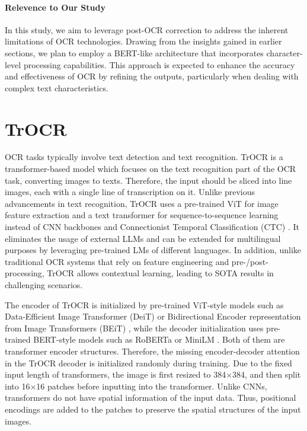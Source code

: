 \paragraph*{Relevence to Our Study}
\label{par:2_post_ocr_relevance}
\hypertarget{model_needs}{In this study, we aim to leverage post-OCR correction to address the inherent limitations of OCR technologies. Drawing from the insights gained in earlier sections, we plan to employ a BERT-like architecture that incorporates character-level processing capabilities. This approach is expected to enhance the accuracy and effectiveness of OCR by refining the outputs, particularly when dealing with complex text characteristics.}

\section{TrOCR}
\label{sec:2_trocr}
OCR tasks typically involve text detection and text recognition. TrOCR is a transformer-based model which focuses on the text recognition part of the OCR task, converting images to texts. Therefore, the input should be sliced into line images, each with a single line of transcription on it. Unlike previous advancements in text recognition, TrOCR uses a pre-trained ViT for image feature extraction and a text transformer \citep{vaswani2017attention} for sequence-to-sequence learning instead of CNN backbones \citep{wang2020cspnet} and Connectionist Temporal Classification (CTC) \citep{graves2006connectionist}. It eliminates the usage of external LLMs and can be extended for multilingual purposes by leveraging pre-trained LMs of different languages. In addition, unlike traditional OCR systems that rely on feature engineering and pre-/post-processing, TrOCR allows contextual learning, leading to SOTA results in challenging scenarios.

The encoder of TrOCR is initialized by pre-trained ViT-style models such as Data-Efficient Image Transformer (DeiT) \citep{touvron2021training} or Bidirectional Encoder representation from Image Transformers (BEiT) \citep{bao2022beit}, while the decoder initialization uses pre-trained BERT-style models such as RoBERTa \citep{liu2019roberta} or MiniLM \citep{wang2020minilm}. Both of them are transformer encoder structures. Therefore, the missing encoder-decoder attention in the TrOCR decoder is initialized randomly during training. Due to the fixed input length of transformers, the image is first resized to 384$\times$384, and then split into 16$\times$16 patches before inputting into the transformer. Unlike CNNs, transformers do not have spatial information of the input data. Thus, positional encodings are added to the patches to preserve the spatial structures of the input images.

